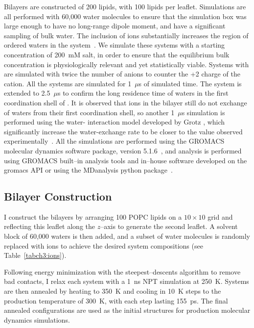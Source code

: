 {Bilayers are constructed of 200 lipids, with 100 lipids per leaflet.}
Simulations are all performed with 
60,000 water molecules to ensure that the simulation box
was large enough to have no long-range dipole moment, 
and have a significant 
sampling of bulk water. The inclusion of ions substantially increases the region of ordered 
waters in the system~\cite{kruczek:2019,saunders:2022}.
We simulate these systems with a starting concentration of 200~mM salt, in order to ensure
that the equilibrium bulk concentration is physiologically relevant and 
{yet} statistically viable.
Systems with \mg are simulated with twice the number of 
anions to counter the +2 charge of the cation. All the systems are simulated for 1~$\mu$s of simulated time. 
The \mgmbnbfix system is extended to 2.5~$\mu$s to confirm the 
long residence time of waters in the first coordination shell of \mg\cite{grotz:2021:optimized}. 
It is observed that ions in the bilayer still do not
exchange of waters from their first coordination shell, 
so another 1~$\mu$s simulation is performed using the water-\mg 
interaction model developed by Grotz \etal{}, which significantly increase the water-exchange rate to be closer 
to the value observed experimentally~\cite{grotz:2021:optimized}.
{All the} simulations are performed using the GROMACS molecular dynamics software package, 
version 5.1.6~\cite{abraham:2015,pall:2014,van:2005,lindahl:2001,berendsen:1995}, and analysis is performed using 
GROMACS built--in analysis tools and in--house software developed
on the gromacs API or using the MDanalysis python package~\cite{gromacsmanual,mdanalysis1,mdanalysis2}.
\subsection{Bilayer Construction}

I construct the bilayers by arranging 100 POPC lipids on a $10 \times 10$ grid
and reflecting this leaflet along the $z$--axis to generate the second leaflet.
A solvent block of 60,000 waters is then added, and a subset of water molecules
is randomly replaced with ions to achieve the desired system compositions
(see Table~\ref{tabch3:ions}). 

Following energy minimization with the steepest--descents algorithm to remove
bad contacts, I relax each system with a 1~ns NPT simulation at 250~K.
Systems are then annealed by heating to 350~K and cooling in 10~K steps to the
production temperature of 300~K, with each step lasting 155~ps.
The final annealed configurations are used as the initial structures for
production molecular dynamics simulations.

